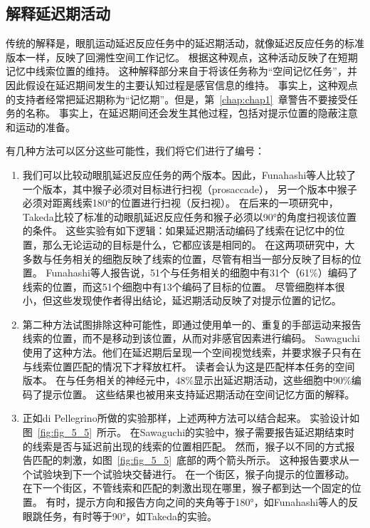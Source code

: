 \subsection{解释延迟期活动}

传统的解释是，眼肌运动延迟反应任务中的延迟期活动，就像延迟反应任务的标准版本一样，反映了回溯性空间工作记忆。
根据这种观点，这种活动反映了在短期记忆中线索位置的维持。
这种解释部分来自于将该任务称为“空间记忆任务”，并因此假设在延迟期间发生的主要认知过程是感官信息的维持。
事实上，这种观点的支持者经常把延迟期称为“记忆期”。但是，第~\ref{chap:chap1}~章警告不要接受任务的名称。
事实上，在延迟期间还会发生其他过程，包括对提示位置的隐蔽注意和运动的准备。


有几种方法可以区分这些可能性，我们将它们进行了编号：


\begin{enumerate}
	\item 我们可以比较动眼肌延迟反应任务的两个版本。因此，Funahashi等人\cite{funahashi1993prefrontal}比较了一个版本，其中猴子必须对目标进行扫视（prosaccade），
	另一个版本中猴子必须对距离线索180°的位置进行扫视（反扫视）。
	在后来的一项研究中，Takeda\cite{takeda2002prefrontal}比较了标准的动眼肌延迟反应任务和猴子必须以90°的角度扫视该位置的条件。
	这些实验有如下逻辑：如果延迟期活动编码了线索在记忆中的位置，那么无论运动的目标是什么，它都应该是相同的。
	在这两项研究中，大多数与任务相关的细胞反映了线索的位置，尽管有相当一部分反映了目标的位置。
	Funahashi等人报告说，51个与任务相关的细胞中有31个（61\%）编码了线索的位置，而这51个细胞中有13个编码了目标的位置。
	尽管细胞样本很小，但这些发现使作者得出结论，延迟期活动反映了对提示位置的记忆。
	\item 第二种方法试图排除这种可能性，即通过使用单一的、重复的手部运动来报告线索的位置，而不是移动到该位置，从而对非感官因素进行编码。
	Sawaguchi\cite{sawaguchi1999properties}使用了这种方法。他们在延迟期后呈现一个空间视觉线索，并要求猴子只有在与线索位置匹配的情况下才释放杠杆。
	读者会认为这是匹配样本任务的空间版本。
	在与任务相关的神经元中，48\%显示出延迟期活动，这些细胞中90\%编码了提示位置。
	这些结果也被用来支持延迟期活动在空间记忆方面的解释。
	\item 正如di Pellegrino\cite{di1993visuospatial}所做的实验那样，上述两种方法可以结合起来。
	实验设计如图~\ref{fig:fig_5_5}~所示。
	在Sawaguchi\cite{sawaguchi1999properties}的实验中，猴子需要报告延迟期结束时的线索是否与延迟前出现的线索的位置相匹配。
	然而，猴子以不同的方式报告匹配的刺激，如图~\ref{fig:fig_5_5}~底部的两个箭头所示。
	这种报告要求从一个试验块到下一个试验块交替进行。
	在一个街区，猴子向提示的位置移动。
	在下一个街区，不管线索和匹配的刺激出现在哪里，猴子都到达一个固定的位置。
	有时，提示方向和报告方向之间的夹角等于180°，如Funahashi等人\cite{funahashi1993prefrontal}的反眼跳任务，有时等于90°，如Takeda\cite{takeda2002prefrontal}的实验。
	

\end{enumerate}
